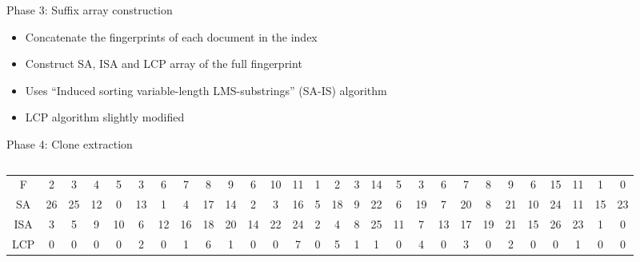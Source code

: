\documentclass[aspectratio=1610, xcolor=table]{beamer}
\begin{document}
\begin{frame}[fragile]{Phase 3: Suffix array construction}
    \begin{itemize}
        \item Concatenate the fingerprints of each document in the index
        \item Construct SA, ISA and LCP array of the full fingerprint
        \item Uses ``Induced sorting variable-length LMS-substrings'' (SA-IS) algorithm
        \item LCP algorithm slightly modified
    \end{itemize}

\end{frame}

\begin{frame}{Phase 4: Clone extraction}
    \begin{columns}
    \end{columns}
    \begin{center}
        \begin{table}
        
            \setlength{\tabcolsep}{2pt}
        \begin{tabular}{c|ccccccccccccccccccccccccccc}
            F & 2 & 3 & 4 & {\color{blue}5} & {\color{blue}3} & {\color{blue}6}
              &{\color{blue} 7} & {\color{blue}8} & {\color{blue}9} & {\color{blue}6} & 10 & 11 & 1 & 2 & 3 & 14 &
            {\color{blue}5} & {\color{blue}3} & {\color{blue}6} & {\color{blue}7} &
            {\color{blue}8} & {\color{blue}9} & 6 & 15 & 11 & 1 & 0 \\
        SA & 26 & 25 & 12 & 0 & 13 & 1 & 4 & 17 & 14 & 2 & {\color{blue}3} &
        {\color{blue}16} & 5 & 18 & 9 & 22 & 6 & 19 & 7 & 20 & 8 & 21 & 10 & 24 & 11 & 15 & 23 \\
        ISA & 3 & 5 & 9 & 10 & 6 & 12 & 16 & 18 & 20 & 14 & 22 & 24 & 2 & 4 & 8 & 25 & {\color{blue}11} & 7 & 13 & 17 & 19 & 21 & 15 & 26 & 23 & 1 & 0 \\
        LCP & 0 &  0 &  0 &  0 &  2 &  0 &  1 &  6 &  1 &  0 &  0 &  {\color{blue} 7} &  0 &  5 &  1 &  1 &  0 &  4 &  0 &  3 &  0 &  2 &  0 &  0 &  1 &  0 &  0
        \end{tabular}
        \end{table}
    \end{center}
\end{frame}
\end{document}
